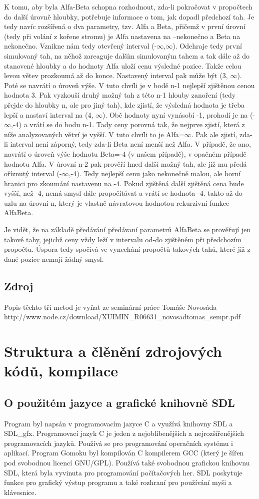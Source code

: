 \documentclass[a4paper,11pt,titlepage]{article}
\begin{document}
K tomu, aby byla Alfa-Beta schopna rozhodnout, zda-li pokračovat v propočtech do
další úrovně hloubky, potřebuje informace o tom, jak dopadl předchozí tah. Je tedy navíc
rozšířená o dva parametry, tzv. Alfa a Beta, přičemž v první úrovní (tedy při volání
z kořene stromu) je Alfa nastavena na –nekonečno a Beta na nekonečno. Vznikne nám
tedy otevřený interval (-$\infty$,$\infty$). Odehraje tedy první simulovaný tah, na něhož zareaguje
dalším simulovaným tahem a tak dále až do stanovené hloubky a do hodnoty Alfa uloží
cenu výsledné pozice. Takže celou levou větev prozkoumá až do konce. Nastavený
interval pak může být (3, $\infty$). Poté se navrátí o úroveň výše. V tuto chvíli je v bodě n-1
nejlepší zjištěnou cenou hodnota 3. Pak vyzkouší druhý možný tah z této n-1 hlouby
zanoření (tedy přejde do hloubky n, ale pro jiný tah), kde zjistí, že výsledná hodnota je
třeba lepší a nastaví interval na (4, $\infty$). Obě hodnoty nyní vynásobí -1, prohodí je na (-
$\infty$,-4) a vrátí se do bodu n-1. Tady ceny porovná tak, že nejprve zjistí, která z níže
analyzovaných větví je vyšší. V tuto chvíli to je Alfa=$\infty$. Pak ale zjistí, zda-li interval není
záporný, tedy zda-li Beta není menší než Alfa. V případě, že ano, navrátí o úroveň výše
hodnotu Beta=-4 (v našem případě), v opačném případě hodnotu Alfa. V úrovní n-2 pak
prověří hned další možný tah, ale již mu předá oříznutý interval (-$\infty$,-4). Tedy nejlepší
cenu jako nekonečně malou, ale horní hranici pro zkoumání nastavenu na -4. Pokud
zjištěná další zjištěná cena bude vyšší, než -4, nemá smysl dále propočítávat a vrátí se
hodnota -4. takto až do uzlu na úrovni n, který je vlastně návratovou hodnotou
rekurzivní funkce AlfaBeta.

Je vidět, že na základě předávání předávaní parametrů AlfaBeta se prověřují jen
takové tahy, jejichž ceny vždy leží v intervalu od-do zjištěném při předchozím propočtu.
Úspora tedy spočívá ve vynechání propočtů takových tahů, které již z dané pozice nemají
žádný smysl.
\subsection*{Zdroj}
Popis těchto tří metod je vyňat ze seminární práce Tomáše Novosáda\\ http://www.node.cz/download/XUIMIN\_R06631\_novosadtomas\_sempr.pdf
\section{Struktura a člěnění zdrojových kódů, kompilace}
\subsection{O použitém jazyce a grafické knihovně SDL}
Program byl napsán v programovacím jazyce C a využívá knihovny SDL a SDL\_gfx. Programovací jazyk C je jeden z nej\-ob\-lí\-be\-něj\-ších a nej\-roz\-ší\-ře\-něj\-ších programovacích jazyků. Používá se pro programování operačních systému i aplikací. Program Gomoku byl kompilován C kompilerem GCC (který je šířen pod svobodnou licencí GNU/GPL). Používá také svobodnou grafickou knihovnu SDL, která byla vyvinuta pro programování po\-čí\-ta\-čo\-vých her. SDL poskytuje funkce pro grafický výstup programu a také rozhraní pro používání myši a klávesnice.
\end{document}
